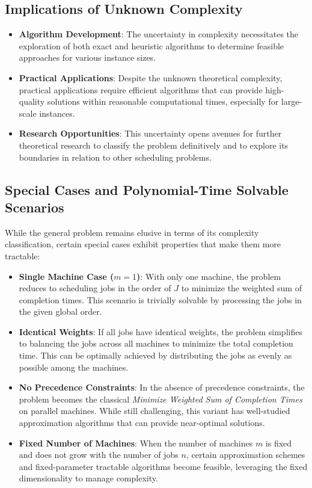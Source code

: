 \subsection{Implications of Unknown Complexity}

\begin{itemize}
    \item \textbf{Algorithm Development}: The uncertainty in complexity necessitates the exploration of both exact and heuristic algorithms to determine feasible approaches for various instance sizes.

    \item \textbf{Practical Applications}: Despite the unknown theoretical complexity, practical applications require efficient algorithms that can provide high-quality solutions within reasonable computational times, especially for large-scale instances.

    \item \textbf{Research Opportunities}: This uncertainty opens avenues for further theoretical research to classify the problem definitively and to explore its boundaries in relation to other scheduling problems.
\end{itemize}

\subsection{Special Cases and Polynomial-Time Solvable Scenarios}

While the general problem remains elusive in terms of its complexity classification, certain special cases exhibit properties that make them more tractable:

\begin{itemize}
    \item \textbf{Single Machine Case ($m=1$)}: With only one machine, the problem reduces to scheduling jobs in the order of $J$ to minimize the weighted sum of completion times. This scenario is trivially solvable by processing the jobs in the given global order.

    \item \textbf{Identical Weights}: If all jobs have identical weights, the problem simplifies to balancing the jobs across all machines to minimize the total completion time. This can be optimally achieved by distributing the jobs as evenly as possible among the machines.

    \item \textbf{No Precedence Constraints}: In the absence of precedence constraints, the problem becomes the classical \emph{Minimize Weighted Sum of Completion Times} on parallel machines. While still challenging, this variant has well-studied approximation algorithms that can provide near-optimal solutions.

    \item \textbf{Fixed Number of Machines}: When the number of machines $m$ is fixed and does not grow with the number of jobs $n$, certain approximation schemes and fixed-parameter tractable algorithms become feasible, leveraging the fixed dimensionality to manage complexity.
\end{itemize}


